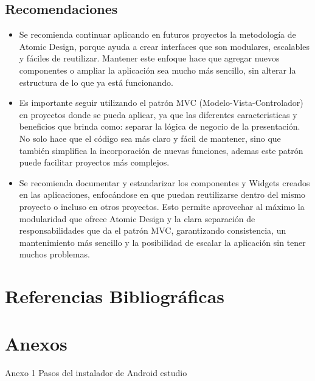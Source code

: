 \documentclass[12pt,letterpaper]{article}
\begin{document}
\subsection{Recomendaciones}

\begin{itemize}
    \item Se recomienda continuar aplicando en futuros proyectos la metodología de Atomic Design, porque ayuda a crear interfaces que son modulares, escalables y fáciles de reutilizar. Mantener este enfoque hace que agregar nuevos componentes o ampliar la aplicación sea mucho más sencillo, sin alterar la estructura de lo que ya está funcionando.
    
    \item Es importante seguir utilizando el patrón MVC (Modelo-Vista-Controlador) en proyectos donde se pueda aplicar, ya que las diferentes caracteristicas y beneficios que brinda como: separar la lógica de negocio de la presentación. No solo hace que el código sea más claro y fácil de mantener, sino que también simplifica la incorporación de nuevas funciones, ademas este patrón puede facilitar proyectos más complejos.
    
    \item Se recomienda documentar y estandarizar los componentes y Widgets creados en las aplicaciones, enfocándose en que puedan reutilizarse dentro del mismo proyecto o incluso en otros proyectos. Esto permite aprovechar al máximo la modularidad que ofrece Atomic Design y la clara separación de responsabilidades que da el patrón MVC, garantizando consistencia, un mantenimiento más sencillo y la posibilidad de escalar la aplicación sin tener muchos problemas.
\end{itemize}



\section{Referencias Bibliográficas}
\printbibliography[heading=none]


\section{Anexos}
Anexo 1 Pasos del instalador de Android estudio
\end{document}
